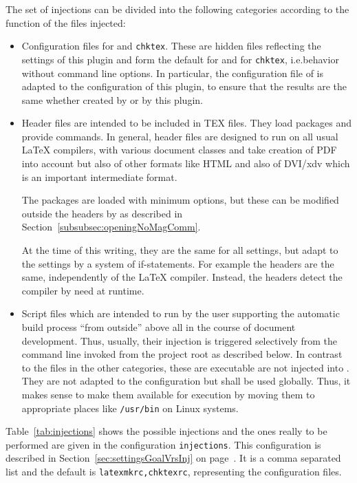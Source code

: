 The set of injections can be divided into the following categories 
according to the function of the files injected: 
%
\begin{itemize}
  \item
  Configuration files for  and \texttt{chktex}. 
  These are hidden files 
  reflecting the settings of this plugin 
  and form the default for  and for \texttt{chktex}, 
  i.e.\@ behavior without command line options. 
  In particular, the configuration file of  
  is adapted to the configuration of this plugin, 
  to ensure that the results are the same whether created by  
  or by this plugin. 
  \item
  Header files are intended to be included in TEX files. 
  They load packages and provide commands. 
  In general, header files are designed to run on all usual \LaTeX{} compilers, 
  with various document classes  
  and take creation of PDF into account but also of other formats like HTML 
  and also of DVI/\gls{xdv} which is an important intermediate format. 

  The packages are loaded with minimum options, 
  but these can be modified outside the headers by  
  as described in Section~\ref{subsubsec:openingNoMagComm}. 

  At the time of this writing, they are the same for all settings, 
  but adapt to the settings by a system of if-statements. 
  For example the headers are the same, independently of the \LaTeX{} compiler. 
  Instead, the headers detect the compiler by need at runtime. 
  \item
  Script files which are intended to run by the user 
  supporting the automatic build process ``from outside''
  above all in the course of document development. 
  Thus, usually, their injection is triggered selectively from the command line 
  invoked from the project root as described below. 
  In contrast to the files in the other categories, these are executable 
  are not injected into . 
  They are not adapted to the configuration but shall be used globally. 
  Thus, it makes sense to make them available for execution 
  by moving them to appropriate places like \texttt{/usr/bin} on Linux systems. 
\end{itemize}

Table~\ref{tab:injections} shows the possible injections 
and the ones really to be performed are given in the configuration \texttt{injections}. 
This configuration is described in Section~\ref{sec:settingsGoalVrsInj} 
on page~\pageref{sec:settingsGoalVrsInj}. 
It is a comma separated list and the default is \texttt{latexmkrc,chktexrc}, 
representing the configuration files. 


